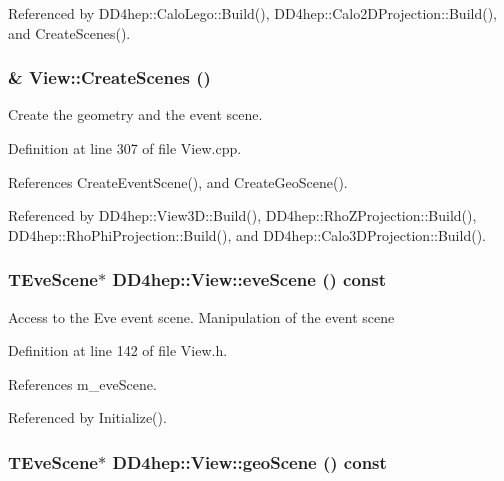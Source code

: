 Referenced by DD4hep::CaloLego::Build(), DD4hep::Calo2DProjection::Build(), and CreateScenes().\hypertarget{class_d_d4hep_1_1_view_a6c2c1c89a0ad7c6a75379103f8523fdc}{
\subsubsection[{CreateScenes}]{ \& View::CreateScenes ()}}
\label{class_d_d4hep_1_1_view_a6c2c1c89a0ad7c6a75379103f8523fdc}


Create the geometry and the event scene. 

Definition at line 307 of file View.cpp.

References CreateEventScene(), and CreateGeoScene().

Referenced by DD4hep::View3D::Build(), DD4hep::RhoZProjection::Build(), DD4hep::RhoPhiProjection::Build(), and DD4hep::Calo3DProjection::Build().\hypertarget{class_d_d4hep_1_1_view_af3bd0cda0c964b1662af9cb24cb26fff}{
\subsubsection[{eveScene}]{\setlength{\rightskip}{0pt plus 5cm}TEveScene$\ast$ DD4hep::View::eveScene () const}}
\label{class_d_d4hep_1_1_view_af3bd0cda0c964b1662af9cb24cb26fff}


Access to the Eve event scene. Manipulation of the event scene 

Definition at line 142 of file View.h.

References m\_\-eveScene.

Referenced by Initialize().\hypertarget{class_d_d4hep_1_1_view_ab95a0aba3fabd1d16496e000ee95a64e}{
\subsubsection[{geoScene}]{\setlength{\rightskip}{0pt plus 5cm}TEveScene$\ast$ DD4hep::View::geoScene () const}}
\label{class_d_d4hep_1_1_view_ab95a0aba3fabd1d16496e000ee95a64e}


